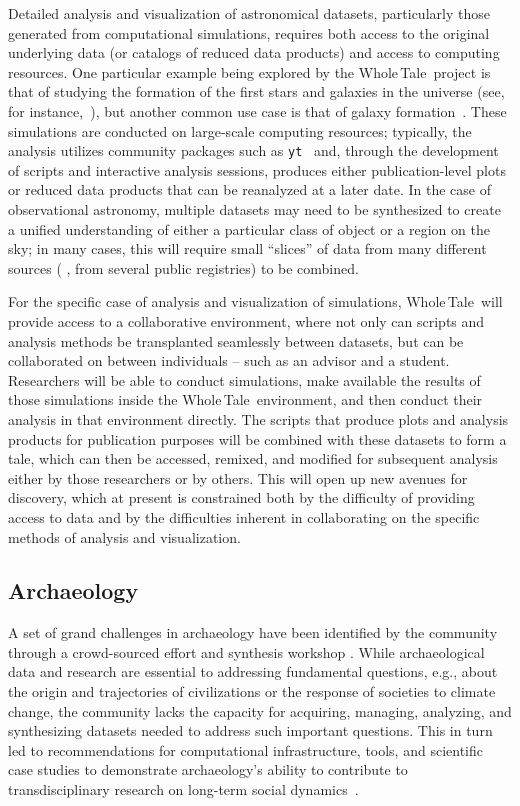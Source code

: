 \documentclass[review]{elsarticle}
\newcommand{\wt}{Whole\,Tale}
\begin{document}
Detailed analysis and visualization of astronomical datasets, particularly those generated from computational simulations, requires both access to the original underlying data (or catalogs of reduced data products) and access to computing resources.  One particular example being explored by the \wt\ project is that of studying the formation of the first stars and galaxies in the universe (see, for instance,~\cite{2015MNRAS.452.2822S}), but another common use case is that of galaxy formation~\citep{2014ApJS..210...14K}.  These simulations are conducted on large-scale computing resources; typically, the analysis utilizes community packages such as \texttt{yt}~\citep{2011ApJS..192....9T} and, through the development of scripts and interactive analysis sessions, produces either publication-level plots or reduced data products that can be reanalyzed at a later date.  In the case of observational astronomy, multiple datasets may need to be synthesized to create a unified understanding of either a particular class of object or a region on the sky; in many cases, this will require small ``slices'' of data from many different sources ( , from several public registries) to be combined.

For the specific case of analysis and visualization of simulations, \wt\ will provide access to a collaborative environment, where not only can scripts and analysis methods be transplanted seamlessly between datasets, but can be collaborated on between individuals -- such as an advisor and a student.  Researchers will be able to conduct simulations, make available the results of those simulations inside the \wt\ environment, and then conduct their analysis in that environment directly.  The scripts that produce plots and analysis products for publication purposes will be combined with these datasets to form a tale, which can then be accessed, remixed, and modified for subsequent analysis either by those researchers or by others.  This will open up new avenues for discovery, which at present is constrained both by the difficulty of providing access to data and by the difficulties inherent in collaborating on the specific methods of analysis and visualization.

\subsection{Archaeology}


A set of grand challenges in archaeology have been identified by the community through a crowd-sourced effort and synthesis workshop \cite{kintigh2014granda}. While archaeological data and research are essential to addressing fundamental questions, e.g., about the origin and trajectories of civilizations or the response of societies to climate change, the community lacks the capacity for acquiring, managing, analyzing, and synthesizing datasets needed to address such important questions. This in turn led to recommendations for computational infrastructure, tools, and scientific case studies to demonstrate archaeology's ability to contribute to transdisciplinary research on long-term social dynamics~\cite{kintigh2015cultural}. 
\end{document}

